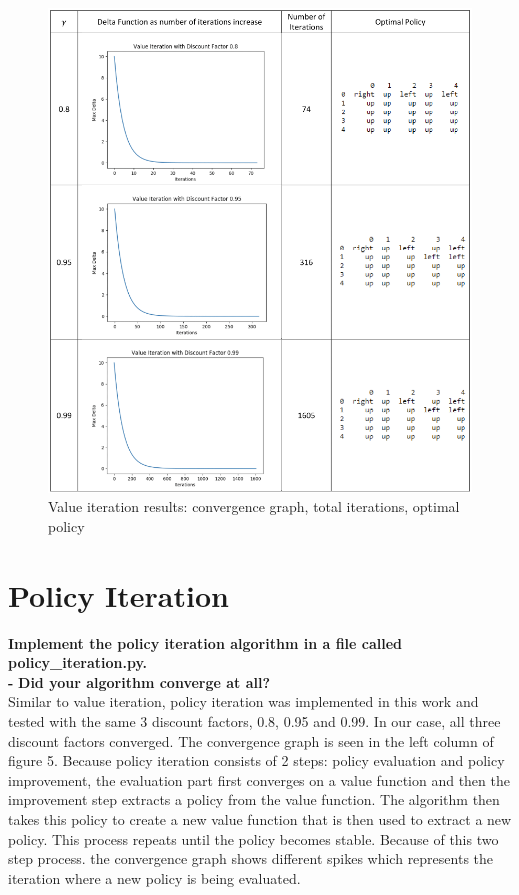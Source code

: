 \documentclass[11pt]{article}
\begin{document}
\newpage
\begin{figure}[h]
\includegraphics[scale=0.5]{VI_chart}
\centering
\caption{Value iteration results: convergence graph, total iterations, optimal policy}
\end{figure}


\newpage
\section{Policy Iteration}
\textbf{Implement the policy iteration algorithm in a file called
policy\_iteration.py.}
\\

\noindent
\textbf{-}
\noindent
\textbf{Did your algorithm converge at all?}
\\

\noindent
Similar to value iteration, policy iteration was implemented in this work and
tested with the same 3 discount factors, 0.8, 0.95 and 0.99. In our case, all
three discount factors converged. The convergence graph is seen in the left
column of figure 5. Because policy iteration consists of 2 steps: policy
evaluation and policy improvement, the evaluation part first converges on a
value function and then the improvement step extracts a policy from the value
function. The algorithm then takes this policy to create a new value function
that is then used to extract a new policy. This process repeats until the policy
becomes stable. Because of this two step process. the convergence graph shows
different spikes which represents the iteration where a new policy is being
evaluated.
\\
\end{document}
